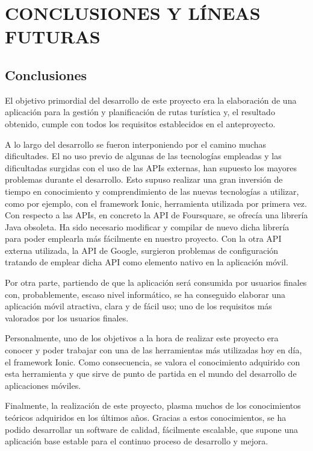 \chapter[Conclusiones y líneas futuras]{
  \label{chp:conclusiones}
  CONCLUSIONES Y LÍNEAS FUTURAS
}
\thispagestyle{numberingStyle}
\pagestyle{numberingStyle}

\section{Conclusiones}

El objetivo primordial del desarrollo de este proyecto era la elaboración de una aplicación para la gestión y planificación de rutas turística y, el resultado obtenido, cumple con todos los requisitos establecidos en el anteproyecto.

A lo largo del desarrollo se fueron interponiendo por el camino muchas dificultades. El no uso previo de algunas de las tecnologías empleadas  y las dificultadas surgidas con el uso de las APIs externas, han supuesto los mayores problemas durante el desarrollo. Esto supuso realizar una gran inversión de tiempo en conocimiento y comprendimiento de las nuevas tecnologías a utilizar, como por ejemplo, con el framework Ionic, herramienta utilizada por primera vez. Con respecto a las APIs, en concreto la API de Foursquare, se ofrecía una librería Java obsoleta. Ha sido necesario modificar y compilar de nuevo dicha librería para poder emplearla más fácilmente en nuestro proyecto. Con la otra API externa utilizada, la API de Google, surgieron problemas de configuración tratando de emplear dicha API como elemento nativo en la aplicación móvil.

Por otra parte, partiendo de que la aplicación será consumida por usuarios finales con, probablemente, escaso nivel informático, se ha conseguido elaborar una aplicación móvil atractiva, clara y de fácil uso; uno de los requisitos más valorados por los usuarios finales.

Personalmente, uno de los objetivos a la hora de realizar este proyecto era conocer y poder trabajar con una de las herramientas más utilizadas hoy en día, el framework Ionic. Como consecuencia, se valora el conocimiento adquirido con esta herramienta y que sirve de punto de partida en el mundo del desarrollo de aplicaciones móviles.

Finalmente, la realización de este proyecto, plasma muchos de los conocimientos teóricos adquiridos en los últimos años. Gracias a estos conocimientos, se ha podido desarrollar un software de calidad, fácilmente escalable, que supone una aplicación base estable para el continuo proceso de desarrollo y mejora.


